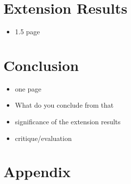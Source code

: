 \documentclass[twocolumn,a4paper]{article}
\begin{document}
    \section{Extension Results}
    \begin{itemize}
        \item 1.5 page
    \end{itemize}


    \section{Conclusion}
    \begin{itemize}
        \item one page
        \item What do you conclude from that
        \item significance of the extension results
        \item critique/evaluation
    \end{itemize}


    \section{Appendix}
\end{document}
